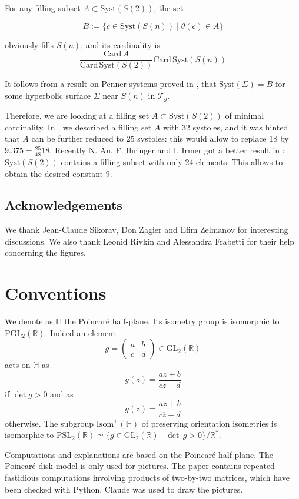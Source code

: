 \documentclass[12pt]{amsart}
\newcommand{\HP}{\mathbb{H}}
\newcommand{\R}{\mathbb{R}}
\newcommand{\Card}{\mathrm{Card\,}}
\newcommand{\GL}{{\mathrm {GL}}}
\newcommand{\Isom}{\mathrm{Isom}}
\newcommand{\PGL}{{\mathrm {PGL}}}
\newcommand{\PSL}{{\mathrm {PSL}}}
\newcommand{\Syst}{{\mathrm {Syst}}}
\newcommand{\cT}{\mathcal{T}}
\begin{document}
 
For any filling subset $A\subset\Syst(S(2))$, the set 

$$B:=\{c\in \Syst(S(n))\mid \theta(c)\in A\}$$
 
\noindent obviously fills $S(n)$, and its cardinality is 
$$\frac{\Card A}{\Card \Syst(S(2))} \Card \Syst(S(n))$$ 

\noindent It follows from a result on Penner systems
proved in \cite{Mathieu},   that  $\Syst(\Sigma)=B$
for some   hyperbolic surface 
$\Sigma$ near $S(n)$ in $\cT_g$. 

Therefore, we are looking at a filling set $A\subset \Syst(S(2))$ 
of minimal cardinality. In \cite{Mathieu}, we described
a filling set $A$ with $32$ systoles, and it was
hinted that $A$ can be further reduced to $25$ systoles:
this would  allow to replace $18$ by
$9.375=\frac{25}{48} 18$.
Recently  N. An, F. Ihringer and I. Irmer
got a better result  in  \cite{AII}:   $\Syst(S(2))$ contains 
a filling subset with only $24$ elements. This allows to  obtain the desired constant $9$.

\subsection*{Acknowledgements}
We thank Jean-Claude Sikorav, Don Zagier and Efim Zelmanov for interesting discussions.  We also thank Leonid Rivkin and Alessandra Frabetti
for their help concerning the figures.








\section{Conventions}

We denote as $\HP$ the Poincar\'e half-plane.
Its isometry group is isomorphic to
$\PGL_2(\R)$. Indeed an element
$$g=\begin{pmatrix} a&b\\c&d
\end{pmatrix}\in \GL_2(\R)$$
\noindent acts on $\HP$ as
$$g(z)=\frac{az+b}{cz+d}$$
\noindent if $\det g >0$ and as
$$g(z)=\frac{a\overline{z}+b}{c\overline{z}+d}$$
\noindent otherwise. The subgroup $\Isom^+(\HP)$ of preserving orientation isometries is isomorphic to 
$\PSL_2(\R)\simeq \{g\in \GL_2(\R)\mid \det\,g>0\}/\R^*.$

Computations and explanations are based on the Poincar\'e half-plane. The Poincar\'e disk model is only used for pictures.
The paper contains repeated fastidious computations involving products of two-by-two matrices, which have been checked with Python. Claude was used to draw the pictures.
\end{document}
